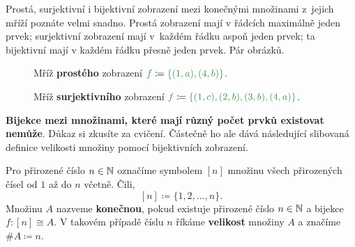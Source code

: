 Prostá, surjektivní i bijektivní zobrazení mezi konečnými množinami z~jejich
mříží poznáte velmi snadno. Prostá zobrazení mají v řádcích maximálně jeden
prvek; surjektivní zobrazení mají v~každém řádku aspoň jeden prvek; ta
bijektivní mají v každém řádku přesně jeden prvek. Pár obrázků.

\begin{figure}[h]
 \centering
 \caption{Mříž \textbf{prostého} zobrazení $\clg{f} \coloneqq
 \clg{\{(1,a),(4,b)\}}$.}
 \label{fig:mriz-proste}
\end{figure}
\newpage

\begin{figure}[h]
 \centering
 \caption{Mříž \textbf{surjektivního} zobrazení $\clg{f} \coloneqq
 \clg{\{(1,c),(2,b),(3,b),(4,a)\}}$.}
 \label{fig:mriz-proste}
\end{figure}

\textbf{Bijekce mezi množinami, které mají různý počet prvků existovat nemůže}.
Důkaz si zkusíte za cvičení. Částečně ho ale dává následující slibovaná definice
velikosti množiny pomocí bijektivních zobrazení.

\begin{definition}
 \label{def:velikost-mnoziny-poradne}
 Pro přirozené číslo $n \in \mathbb{N}$ označíme symbolem $[n]$ množinu všech
 přirozených čísel od $1$ až do $n$ včetně. Čili,
 \[
  [n] \coloneqq \{1,2,\ldots,n\}.
 \]
 Množinu $A$ nazveme \textbf{konečnou}, pokud existuje přirozené číslo ${n \in
 \mathbb{N}}$ a bijekce $f:[n] \cong A$. V takovém případě číslu $n$ říkáme
 \textbf{velikost} množiny $A$ a značíme $\# A \coloneqq n$.
\end{definition}

